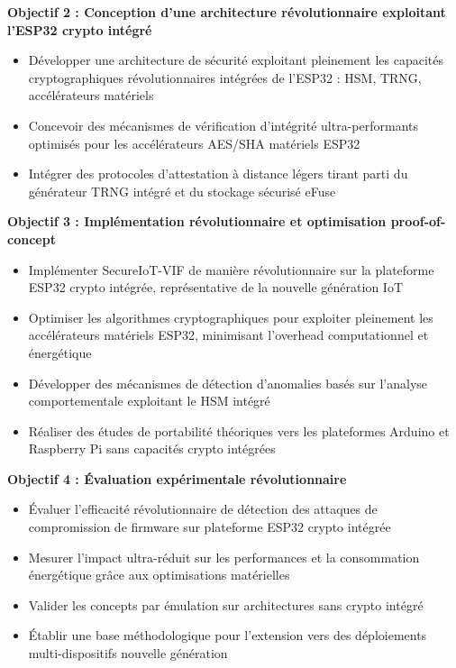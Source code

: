 \textbf{Objectif 2 : Conception d'une architecture révolutionnaire exploitant l'ESP32 crypto intégré}
\begin{itemize}
    \item Développer une architecture de sécurité exploitant pleinement les capacités cryptographiques révolutionnaires intégrées de l'ESP32 : HSM, TRNG, accélérateurs matériels
    \item Concevoir des mécanismes de vérification d'intégrité ultra-performants optimisés pour les accélérateurs AES/SHA matériels ESP32
    \item Intégrer des protocoles d'attestation à distance légers tirant parti du générateur TRNG intégré et du stockage sécurisé eFuse
\end{itemize}

\textbf{Objectif 3 : Implémentation révolutionnaire et optimisation proof-of-concept}
\begin{itemize}
    \item Implémenter SecureIoT-VIF de manière révolutionnaire sur la plateforme ESP32 crypto intégrée, représentative de la nouvelle génération IoT
    \item Optimiser les algorithmes cryptographiques pour exploiter pleinement les accélérateurs matériels ESP32, minimisant l'overhead computationnel et énergétique
    \item Développer des mécanismes de détection d'anomalies basés sur l'analyse comportementale exploitant le HSM intégré
    \item Réaliser des études de portabilité théoriques vers les plateformes Arduino et Raspberry Pi sans capacités crypto intégrées
\end{itemize}

\textbf{Objectif 4 : Évaluation expérimentale révolutionnaire}
\begin{itemize}
    \item Évaluer l'efficacité révolutionnaire de détection des attaques de compromission de firmware sur plateforme ESP32 crypto intégrée
    \item Mesurer l'impact ultra-réduit sur les performances et la consommation énergétique grâce aux optimisations matérielles
    \item Valider les concepts par émulation sur architectures sans crypto intégré
    \item Établir une base méthodologique pour l'extension vers des déploiements multi-dispositifs nouvelle génération
\end{itemize}

